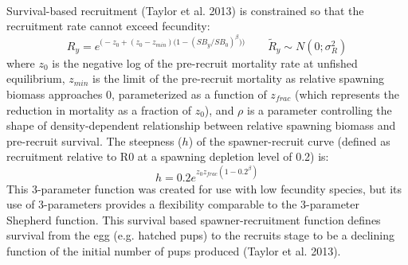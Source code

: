 	\item[Survivorship]\hfill\\
	Survival-based recruitment (Taylor et al. 2013) is constrained so that the recruitment rate cannot exceed fecundity:
	\begin{equation}{ R_y = e^{\Big(-z_0 + (z_0-z_{min})\big(1-(SB_y/SB_0)^\beta \big)\Big)}\qquad  \tilde{R}_y\sim N(0;\sigma^2_R)}
	\end{equation}
	where $z_0$ is the negative log of the pre-recruit mortality rate at unfished equilibrium, $z_{min}$ is the limit of the pre-recruit mortality as relative spawning biomass approaches 0, parameterized as a function of $z_{frac}$ (which represents the reduction in mortality as a fraction of $z_0$), and $\rho$ is a parameter controlling the shape of density-dependent relationship between relative spawning biomass and pre-recruit survival. The steepness ($h$) of the spawner-recruit curve (defined as recruitment relative to R0 at a spawning depletion level of 0.2) is:\\
	\begin{equation}
		h = 0.2e^{z_0z_{frac}(1-0.2^\beta)}
	\end{equation}
	This 3-parameter function was created for use with low fecundity species, but its use of 3-parameters provides a flexibility comparable to the 3-parameter Shepherd function.  This survival based spawner-recruitment function defines survival from the egg (e.g. hatched pups) to the recruits stage to be a declining function of the initial number of pups produced (Taylor et al. 2013).
